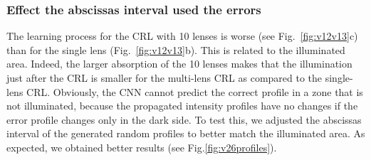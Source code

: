 \documentclass{iucr}
\begin{document}
\subsubsection{Effect the abscissas interval used the errors}
The learning process for the CRL with 10 lenses is worse (see Fig.~\ref{fig:v12v13}c) than for the single lens (Fig.~\ref{fig:v12v13}b). This is related to the illuminated area. Indeed, the larger absorption of the 10 lenses makes that the illumination just after the CRL is smaller for the multi-lens CRL as compared to the single-lens CRL. Obviously, the CNN cannot predict the correct profile in a zone that is not illuminated, because the propagated intensity profiles have no changes if the error profile changes only in the dark side. To test this, we adjusted the abscissas interval of the generated random profiles to better match the illuminated area. As expected, we obtained better results (see Fig.\ref{fig:v26profiles}).
\end{document}
